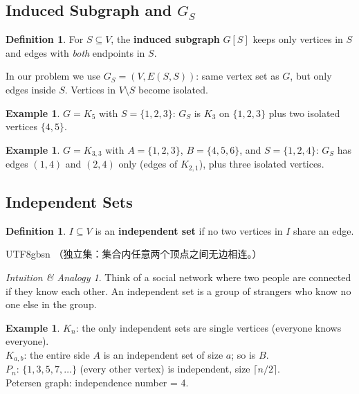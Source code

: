 \documentclass[12pt]{article}
\theoremstyle{definition}
\newtheorem{definition}[theorem]{Definition}
\newtheorem{example}[theorem]{Example}
\theoremstyle{remark}
\newtheorem{intuition}[theorem]{Intuition \& Analogy}
\begin{document}
\subsection{Induced Subgraph and \texorpdfstring{$G_S$}{GS}}

\begin{definition}
For $S \subseteq V$, the \textbf{induced subgraph} $G[S]$ keeps only vertices in $S$
and edges with \emph{both} endpoints in $S$.

In our problem we use $G_S = (V, E(S,S))$: same vertex set as $G$,
but only edges inside $S$.  Vertices in $V \setminus S$ become isolated.
\end{definition}

\begin{example}
$G = K_5$ with $S = \{1,2,3\}$: $G_S$ is $K_3$ on $\{1,2,3\}$ plus two isolated vertices $\{4,5\}$.
\end{example}

\begin{example}
$G = K_{3,3}$ with $A = \{1,2,3\}$, $B = \{4,5,6\}$, and $S = \{1,2,4\}$:
$G_S$ has edges $(1,4)$ and $(2,4)$ only (edges of $K_{2,1}$), plus three isolated vertices.
\end{example}

\subsection{Independent Sets}

\begin{definition}
$I \subseteq V$ is an \textbf{independent set} if no two vertices in $I$ share an edge.
\end{definition}

\begin{CJK}{UTF8}{gbsn}
（独立集：集合内任意两个顶点之间无边相连。）
\end{CJK}

\begin{intuition}
Think of a social network where two people are connected if they know each other.
An independent set is a group of strangers who know no one else in the group.
\end{intuition}

\begin{example}
$K_n$: the only independent sets are single vertices (everyone knows everyone).\\
$K_{a,b}$: the entire side $A$ is an independent set of size $a$; so is $B$.\\
$P_n$: $\{1,3,5,7,\ldots\}$ (every other vertex) is independent, size $\lceil n/2 \rceil$.\\
Petersen graph: independence number = 4.
\end{example}
\end{document}
